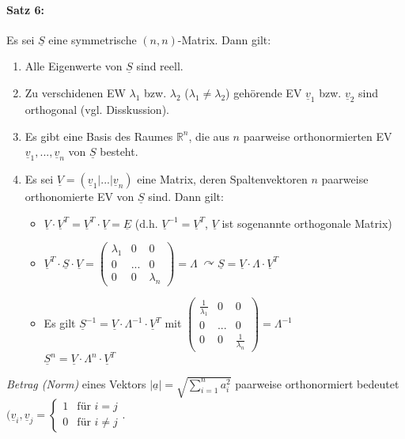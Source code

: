 \paragraph{Satz 6:} \parskp
Es sei $\underline{S}$ eine symmetrische $(n,n)$-Matrix. Dann gilt:
\begin{enumerate}[label=(\arabic*)]
\item Alle Eigenwerte von $\underline{S}$ sind reell.
\item Zu verschidenen EW $\lambda_1$ bzw. $\lambda_2$ ($\lambda_1 \not = \lambda_2$) gehörende EV $\underline{v}_1$ bzw. $\underline{v}_2$ sind orthogonal (vgl. Disskussion).
\item Es gibt eine Basis des Raumes $\mathbb{R}^n$, die aus $n$ paarweise orthonormierten EV $\underline{v}_1, ... , \underline{v}_n$ von $\underline{S}$ besteht.
\item Es sei $\underline{V}=(\underline{v}_1|...|\underline{v}_n)$ eine Matrix, deren Spaltenvektoren $n$ paarweise orthonomierte EV von $\underline{S}$ sind. Dann gilt:
\begin{itemize}
\item $\underline{V} \cdot \underline{V}^T=\underline{V}^T\cdot \underline{V} = \underline{E}$ (d.h. $\underline{V}^{-1}=\underline{V}^T$, $\underline{V}$ ist sogenannte orthogonale Matrix)
\item $\underline{V}^T\cdot \underline{S}\cdot \underline{V}=\begin{pmatrix}
\lambda_1 & 0 & 0\\
0 & ... & 0\\
0 & 0 & \lambda_n
\end{pmatrix}=\Lambda \; \curvearrowright \boxed{\underline{S}=\underline{V} \cdot\Lambda\cdot \underline{V}^T}$
\item Es gilt $\underline{S}^{-1}=\underline{V}\cdot\Lambda^{-1}\cdot\underline{V}^T$ mit $\begin{pmatrix}
\tfrac{1}{\lambda_1} & 0 & 0\\
0 & ... & 0\\
0 & 0 & \tfrac{1}{\lambda_n}
\end{pmatrix}=\Lambda^{-1}$\\
$\underline{S}^n=\underline{V}\cdot\Lambda^n\cdot\underline{V}^T$
\end{itemize}
\end{enumerate}
\emph{Betrag (Norm)} eines Vektors $|\underline{a}|=\sqrt{\sum_{i=1}^n a_i^2}$ paarweise orthonormiert bedeutet $(\underline{v}_i, \underline{v}_j=\begin{cases}
1 & \text{für }i=j\\
0 & \text{für }i \not = j
\end{cases}$.

 